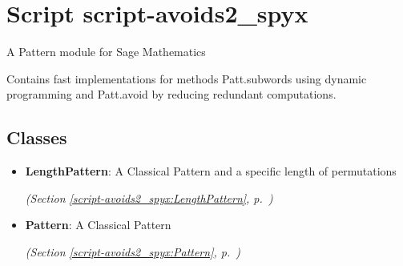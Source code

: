 %
%
%


\section{Script script-avoids2\_spyx}

    \label{script-avoids2_spyx}
A Pattern module for Sage Mathematics

Contains fast implementations for methods Patt.subwords using dynamic 
programming and Patt.avoid by reducing redundant computations.



\subsection{Classes}

\begin{itemize}  \setlength{\parskip}{0ex}
  \item \textbf{LengthPattern}: A Classical Pattern and a specific length of permutations



  \textit{(Section \ref{script-avoids2_spyx:LengthPattern}, p.~\pageref{script-avoids2_spyx:LengthPattern})}

  \item \textbf{Pattern}: A Classical Pattern



  \textit{(Section \ref{script-avoids2_spyx:Pattern}, p.~\pageref{script-avoids2_spyx:Pattern})}

\end{itemize}



